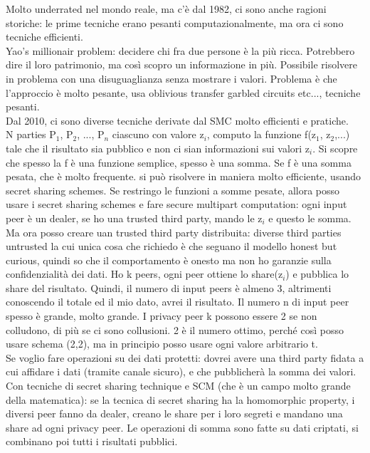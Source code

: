 \documentclass[16px]{article}
\begin{document}
Molto underrated nel mondo reale, ma c'è dal 1982, ci sono anche ragioni storiche: le prime tecniche erano pesanti computazionalmente, ma ora ci sono tecniche efficienti.\\ Yao's millionair problem: decidere chi fra due persone è la più ricca. Potrebbero dire il loro patrimonio, ma così scopro un informazione in più. Possibile risolvere in problema con una disuguaglianza senza mostrare i valori. Problema è che l'approccio è molto pesante, usa oblivious transfer garbled circuits etc..., tecniche pesanti.\\ Dal 2010, ci sono diverse tecniche derivate dal SMC molto efficienti e pratiche.\\ N parties P$_1$, P$_2$, ..., P$_n$ ciascuno con valore z$_i$, computo la funzione f(z$_1$, z$_2$,...) tale che il risultato sia pubblico e non ci sian informazioni sui valori z$_i$. Si scopre che spesso la f è una funzione semplice, spesso è una somma. Se f è una somma pesata, che è molto frequente. si può risolvere in maniera molto efficiente, usando secret sharing schemes. Se restringo le funzioni a somme pesate, allora posso usare i secret sharing schemes e fare secure multipart computation: ogni input peer è un dealer, se ho una trusted third party, mando le z$_i$ e questo le somma.\\ Ma ora posso creare uan trusted third party distribuita: diverse third parties untrusted la cui unica cosa che richiedo è che seguano il modello honest but curious, quindi so che il comportamento è onesto ma non ho garanzie sulla confidenzialità dei dati. Ho k peers, ogni peer ottiene lo share(z$_i$) e pubblica lo share del risultato. Quindi, il numero di input peers è almeno 3, altrimenti conoscendo il totale ed il mio dato, avrei il risultato. Il numero n di input peer spesso è grande, molto grande. I privacy peer k possono essere 2 se non colludono, di più se ci sono collusioni. 2 è il numero ottimo, perché così posso usare schema (2,2), ma in principio posso usare ogni valore arbitrario t.\\ Se voglio fare operazioni su dei dati protetti: dovrei avere una third party fidata a cui affidare i dati (tramite canale sicuro), e che pubblicherà la somma dei valori. Con tecniche di secret sharing technique e SCM (che è un campo molto grande della matematica): se la tecnica di secret sharing ha la homomorphic property, i diversi peer fanno da dealer, creano le share per i loro segreti e mandano una share ad ogni privacy peer. Le operazioni di somma sono fatte su dati criptati, si combinano poi tutti i risultati pubblici.
\end{document}
